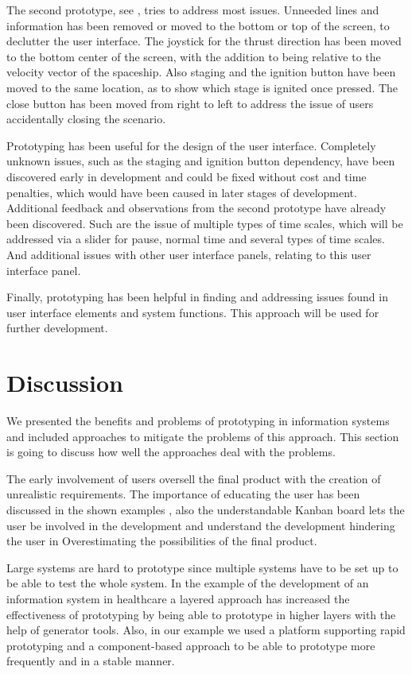 \documentclass[runningheads]{llncs}
\begin{document}
The second prototype, see , tries to address most issues. Unneeded lines and information has been removed or moved to the bottom 
or top of the screen, to declutter the user interface. The joystick for the thrust direction has been moved to the bottom center of the screen, with 
the addition to being relative to the velocity vector of the spaceship. Also staging and the ignition button have been moved to the 
same location, as to show which stage is ignited once pressed. The close button has been moved from right to left to address the issue of users accidentally closing the scenario.

Prototyping has been useful for the design of the user interface. Completely unknown issues, such as the staging and ignition button dependency,
have been discovered early in development and could be fixed without cost and time penalties, which would have been caused in later stages of development.
Additional feedback and observations from the second prototype have already been discovered. Such are the issue of multiple types of time scales, which
will be addressed via a slider for pause, normal time and several types of time scales. And additional issues with other user interface panels, relating
to this user interface panel.

Finally, prototyping has been helpful in finding and addressing issues found in user interface elements and system functions. This approach
will be used for further development.

\section{Discussion}
We presented the benefits and problems of prototyping in information systems and included approaches to mitigate 
the problems of this approach. This section is going to discuss how well the approaches deal with the problems.

The early involvement of users oversell the final product with the creation of unrealistic requirements. The importance
of educating the user has been discussed in the shown examples \cite{ref_health,ref_prac}, also the understandable
Kanban board lets the user be involved in the development and understand the development hindering the user in Overestimating
the possibilities of the final product. 

Large systems are hard to prototype since multiple systems have to be set up to be able to test the whole system. 
In the example of the development of an information system in healthcare \cite{ref_health} a layered approach 
has increased the effectiveness of prototyping by being able to prototype in higher layers with the help of 
generator tools. Also, in our example we used a platform supporting rapid prototyping and a component-based approach
to be able to prototype more frequently and in a stable manner. 
\end{document}
